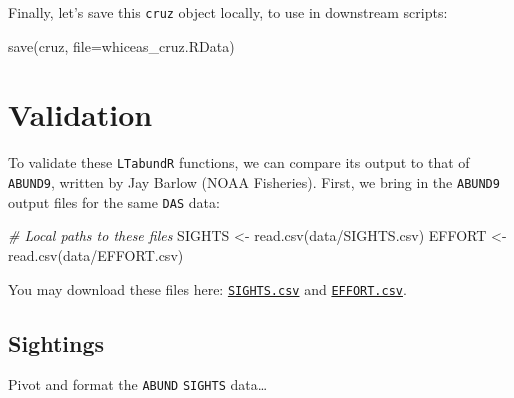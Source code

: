 \documentclass[
]{book}
\newenvironment{Shaded}{\begin{snugshade}}{\end{snugshade}}
\newcommand{\AttributeTok}[1]{\textcolor[rgb]{0.77,0.63,0.00}{#1}}
\newcommand{\CommentTok}[1]{\textcolor[rgb]{0.56,0.35,0.01}{\textit{#1}}}
\newcommand{\FunctionTok}[1]{\textcolor[rgb]{0.00,0.00,0.00}{#1}}
\newcommand{\NormalTok}[1]{#1}
\newcommand{\OtherTok}[1]{\textcolor[rgb]{0.56,0.35,0.01}{#1}}
\newcommand{\StringTok}[1]{\textcolor[rgb]{0.31,0.60,0.02}{#1}}
\begin{document}
Finally, let's save this \texttt{cruz} object locally, to use in downstream scripts:

\begin{Shaded}
\begin{Highlighting}[]
\FunctionTok{save}\NormalTok{(cruz, }\AttributeTok{file=}\StringTok{\textquotesingle{}whiceas\_cruz.RData\textquotesingle{}}\NormalTok{)}
\end{Highlighting}
\end{Shaded}

\hypertarget{validation}{%
\section*{Validation}\label{validation}}

To validate these \texttt{LTabundR} functions, we can compare its output to that of \texttt{ABUND9}, written by Jay Barlow (NOAA Fisheries). First, we bring in the \texttt{ABUND9} output files for the same \texttt{DAS} data:

\begin{Shaded}
\begin{Highlighting}[]
\CommentTok{\# Local paths to these files}
\NormalTok{SIGHTS }\OtherTok{\textless{}{-}} \FunctionTok{read.csv}\NormalTok{(}\StringTok{\textquotesingle{}data/SIGHTS.csv\textquotesingle{}}\NormalTok{)}
\NormalTok{EFFORT }\OtherTok{\textless{}{-}} \FunctionTok{read.csv}\NormalTok{(}\StringTok{\textquotesingle{}data/EFFORT.csv\textquotesingle{}}\NormalTok{)}
\end{Highlighting}
\end{Shaded}

You may download these files here: \href{https://raw.githubusercontent.com/emk-noaa/LTAvignette/main/data/SIGHTS.csv?token=GHSAT0AAAAAACFPESQVEDYQZ5I77WTDK2WIZGRKVMA}{\texttt{SIGHTS.csv}} and \href{https://raw.githubusercontent.com/emk-noaa/LTAvignette/main/data/EFFORT.csv?token=GHSAT0AAAAAACFPESQVOUD6HRSILDUWOFF2ZGRKU6A}{\texttt{EFFORT.csv}}.

\hypertarget{sightings}{%
\subsection*{Sightings}\label{sightings}}

Pivot and format the \texttt{ABUND} \texttt{SIGHTS} data\ldots{}
\end{document}
